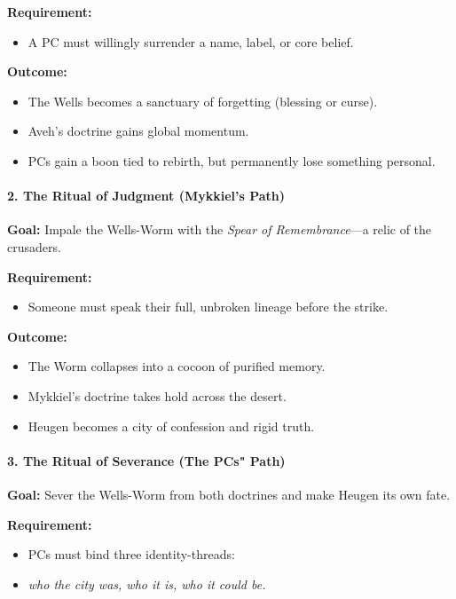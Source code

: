 \documentclass[11pt]{book}
\begin{document}
\textbf{Requirement:}
\begin{itemize}
    \item A PC must willingly surrender a name, label, or core belief.
\end{itemize}

\textbf{Outcome:}
\begin{itemize}
    \item The Wells becomes a sanctuary of forgetting (blessing or curse).
    \item Aveh's doctrine gains global momentum.
    \item PCs gain a boon tied to rebirth, but permanently lose something personal.
\end{itemize}

\paragraph{2. The Ritual of Judgment (Mykkiel's Path)}

\textbf{Goal:} Impale the Wells-Worm with the \emph{Spear of Remembrance}---a relic of the crusaders.

\textbf{Requirement:}
\begin{itemize}
    \item Someone must speak their full, unbroken lineage before the strike.
\end{itemize}

\textbf{Outcome:}
\begin{itemize}
    \item The Worm collapses into a cocoon of purified memory.
    \item Mykkiel's doctrine takes hold across the desert.
    \item Heugen becomes a city of confession and rigid truth.
\end{itemize}

\paragraph{3. The Ritual of Severance (The PCs" Path)}

\textbf{Goal:} Sever the Wells-Worm from both doctrines and make Heugen its own fate.

\textbf{Requirement:}
\begin{itemize}
    \item PCs must bind three identity-threads:
    \item \emph{who the city was, who it is, who it could be.}
\end{itemize}
\end{document}
